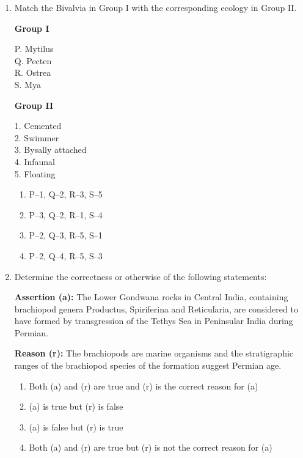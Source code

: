 \documentclass[journal,12pt,onecolumn]{IEEEtran}
\theoremstyle{remark}
\begin{document}
\begin{enumerate}
\newpage



\item Match the Bivalvia in Group I with the corresponding ecology in Group II.

\begin{multicols}{2}
\textbf{Group I}  
\begin{flushleft}
P. Mytilus\\
Q. Pecten\\
R. Ostrea\\
S. Mya
\end{flushleft}

\columnbreak

\textbf{Group II}  
\begin{flushleft}
1. Cemented\\
2. Swimmer\\
3. Bysally attached\\
4. Infaunal\\
5. Floating
\end{flushleft}
\end{multicols}

\begin{multicols}{2}
\begin{enumerate}
\item P--1, Q--2, R--3, S--5  
\item P--3, Q--2, R--1, S--4  
\item P--2, Q--3, R--5, S--1  
\item P--2, Q--4, R--5, S--3  
\end{enumerate}
\end{multicols}




\item Determine the correctness or otherwise of the following statements:

\textbf{Assertion (a):} The Lower Gondwana rocks in Central India, containing brachiopod genera Productus, Spiriferina and Reticularia, are considered to have formed by transgression of the Tethys Sea in Peninsular India during Permian.

\textbf{Reason (r):} The brachiopods are marine organisms and the stratigraphic ranges of the brachiopod species of the formation suggest Permian age.

\begin{enumerate}
\item Both (a) and (r) are true and (r) is the correct reason for (a)  
\item (a) is true but (r) is false  
\item (a) is false but (r) is true  
\item Both (a) and (r) are true but (r) is not the correct reason for (a)  
\end{enumerate}


\end{enumerate}
\end{document}
